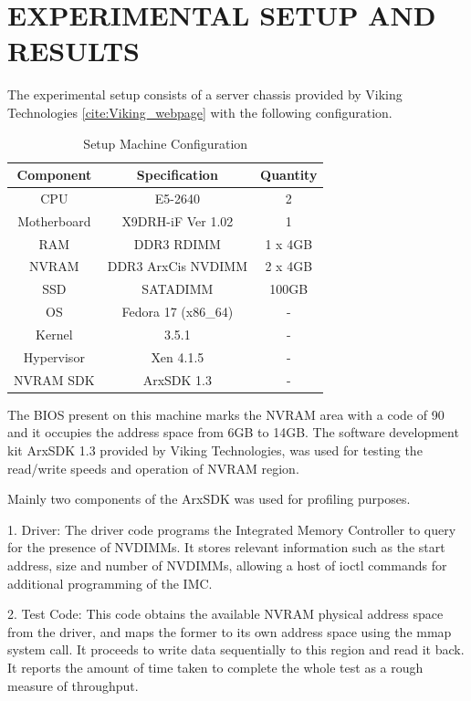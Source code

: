 

\chapter{\uppercase{Experimental Setup and Results}}

The experimental setup consists of a server chassis provided by Viking Technologies \ref{cite:Viking_webpage} with the following configuration. 


\begin{table}[H]
\centering
\caption{Setup Machine Configuration}
\label{tab:unixcomp}
\begin{tabular}{|c|c|c|}
    \hline
    Component & Specification & Quantity \\
    \hline
    \hline
    CPU & E5-2640 & 2                    \\
    \hline
    Motherboard & X9DRH-iF Ver 1.02 & 1  \\
    \hline
    RAM & DDR3 RDIMM & 1 x 4GB           \\
    \hline
    NVRAM & DDR3 ArxCis NVDIMM & 2 x 4GB \\
    \hline
    SSD & SATADIMM & 100GB               \\
    \hline
    OS & Fedora 17 (x86\_64) & -         \\
    \hline
    Kernel & 3.5.1 & -                   \\
    \hline
    Hypervisor & Xen 4.1.5 & -           \\
    \hline
    NVRAM SDK & ArxSDK 1.3 & -           \\
    \hline
\end{tabular}
\end{table}

The BIOS present on this machine marks the NVRAM area with a code of 90 and it occupies the address space from 6GB to 14GB. The software development kit ArxSDK 1.3 provided by Viking Technologies, was used for testing the read/write speeds and operation of NVRAM region.

Mainly two components of the ArxSDK was used for profiling purposes.

1. Driver: The driver code programs the Integrated Memory Controller to query for the presence of NVDIMMs. It stores relevant information such as the start address, size and number of NVDIMMs, allowing a host of ioctl commands for additional programming of the IMC.

2. Test Code: This code obtains the available NVRAM physical address space from the driver, and maps the former to its own address space using the mmap system call. It proceeds to write data sequentially to this region and read it back. It reports the amount of time taken to complete the whole test as a rough measure of throughput.

